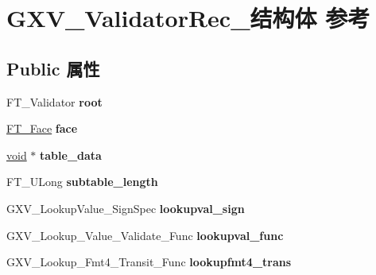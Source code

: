 \hypertarget{struct_g_x_v___validator_rec__}{}\section{G\+X\+V\+\_\+\+Validator\+Rec\+\_\+结构体 参考}
\label{struct_g_x_v___validator_rec__}
\subsection*{Public 属性}
\begin{DoxyCompactItemize}
\item 
\mbox{\label{struct_g_x_v___validator_rec___a2a0e279d80fbadf4650451684a9cbc44}} 
F\+T\+\_\+\+Validator {\bfseries root}
\item 
\mbox{\label{struct_g_x_v___validator_rec___a9af04b6e46298908804d2c500529136e}} 
\hyperlink{struct_f_t___face_rec__}{F\+T\+\_\+\+Face} {\bfseries face}
\item 
\mbox{\label{struct_g_x_v___validator_rec___a5f6e15e04c9cbb6575225dd363d72ea6}} 
\hyperlink{interfacevoid}{void} $\ast$ {\bfseries table\+\_\+data}
\item 
\mbox{\label{struct_g_x_v___validator_rec___a7413e3a11db198863ae86ea307a5125a}} 
F\+T\+\_\+\+U\+Long {\bfseries subtable\+\_\+length}
\item 
\mbox{\label{struct_g_x_v___validator_rec___abb2e3fa544f110a96156fe7cd7a3cf61}} 
G\+X\+V\+\_\+\+Lookup\+Value\+\_\+\+Sign\+Spec {\bfseries lookupval\+\_\+sign}
\item 
\mbox{\label{struct_g_x_v___validator_rec___aa58a11411224dcd3b34dfeb806ca0921}} 
G\+X\+V\+\_\+\+Lookup\+\_\+\+Value\+\_\+\+Validate\+\_\+\+Func {\bfseries lookupval\+\_\+func}
\item 
\mbox{\label{struct_g_x_v___validator_rec___a24a5a6f331e73e813ca541a5c875acc3}} 
G\+X\+V\+\_\+\+Lookup\+\_\+\+Fmt4\+\_\+\+Transit\+\_\+\+Func {\bfseries lookupfmt4\+\_\+trans}
\item 

\end{DoxyCompactItemize}
